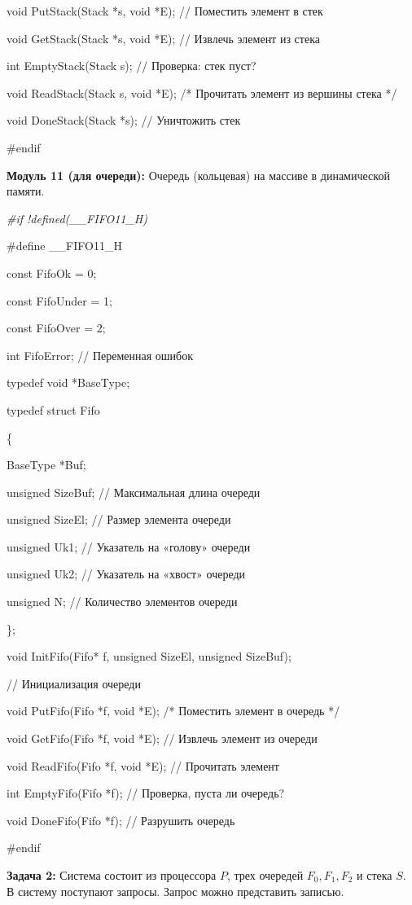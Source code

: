 \documentclass[12pt]{article}
\begin{document}
{{		void PutStack(Stack *s, void *E); // Поместить элемент в стек      
		
		void GetStack(Stack *s, void *E); // Извлечь элемент из стека  
		
		int EmptyStack(Stack s);  // Проверка: стек пуст?
		
		void ReadStack(Stack s, void *E);  /* Прочитать элемент из вершины стека */
		
		void DoneStack(Stack *s); // Уничтожить стек
		
		\#endif}
	
	{\bf Модуль 11 (для очереди):} Очередь (кольцевая) на массиве в динамической памяти.
	
	{\it \#if !defined(\_\_FIFO11\_H)
		
	\#define \_\_FIFO11\_H
	
	const FifoOk = 0;
	
	const FifoUnder = 1;
	
	const FifoOver = 2;
	
	int FifoError; // Переменная ошибок
	
	typedef void *BaseType; 
	
	typedef struct Fifo
	
	\{
	
		BaseType *Buf;
	
		unsigned SizeBuf; // Максимальная длина очереди
	
		unsigned SizeEl; // Размер элемента очереди
	
		unsigned Uk1; // Указатель на «голову» очереди
	
		unsigned Uk2; // Указатель на «хвост» очереди
	
		unsigned N;   // Количество элементов очереди
	
	\};
	
	void InitFifo(Fifo* f, unsigned SizeEl, unsigned SizeBuf);    
	
	// Инициализация очереди
	
	void PutFifo(Fifo *f, void *E); /* Поместить элемент в очередь */
	
	void GetFifo(Fifo *f, void *E); // Извлечь элемент из очереди 
	
	void ReadFifo(Fifo *f, void *E);  // Прочитать элемент                  
	
	int  EmptyFifo(Fifo *f); // Проверка, пуста ли очередь?
	
	void DoneFifo(Fifo *f); // Разрушить очередь
	
	\#endif}
	
	{\bf Задача 2:} Система состоит из процессора $P$, трех очередей $F_0,  F_1,  F_2$ и стека $S$. В систему поступают запросы. Запрос можно представить записью.
	
}
\end{document}
